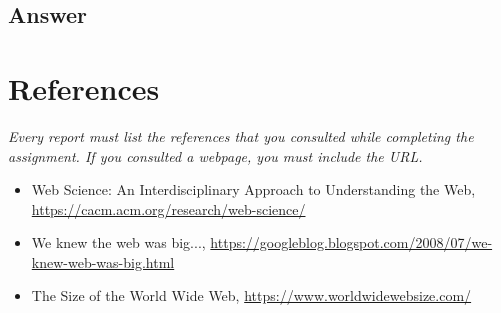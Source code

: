 \documentclass[12pt]{article}
\begin{document}
\subsection*{Answer}

\section*{References}

\emph{Every report must list the references that you consulted while completing the assignment. If you consulted a webpage, you must include the URL.}

\begin{itemize}
    \item {Web Science: An Interdisciplinary Approach to Understanding the Web, \url{https://cacm.acm.org/research/web-science/}}
    \item{We knew the web was big..., \url{https://googleblog.blogspot.com/2008/07/we-knew-web-was-big.html}}
    \item{The Size of the World Wide Web, \url{https://www.worldwidewebsize.com/}}
\end{itemize}
\end{document}
